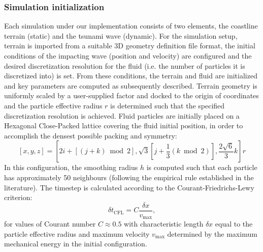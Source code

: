 \documentclass{llncs}
\begin{document}
\subsubsection{Simulation initialization} Each simulation under our implementation
consists of two elements, the coastline terrain (static) and the tsunami wave
(dynamic). For the simulation setup, terrain is imported from a suitable 3D geometry
definition file format, the initial conditions of the impacting wave (position and
velocity) are configured and the desired discretization resolution for the fluid (i.e. the
number of particles it is discretized into) is set. From these conditions, the terrain and
fluid are initialized and key parameters are computed as subsequently described. Terrain
geometry is uniformly scaled by a user-supplied factor and docked to the origin of
coordinates and the particle effective radius $r$ is determined such that the specified
discretization resolution is achieved. Fluid particles are initially placed on a Hexagonal
Close-Packed lattice covering the fluid initial position, in order to accomplish the
densest possible packing and symmetry:
\begin{equation}
  \label{eq:hcp}
  [x, y, z] = \left[ 2i+[(j+k) \bmod 2], \sqrt{3}[j + \frac{1}{3} (k \bmod 2)],
    \frac{2\sqrt{6}}{3} k \right] r
\end{equation}
In this configuration, the smoothing radius $h$ is computed such that each particle has
approximately 50 neighbours (following the empirical rule established in the
literature). The timestep is calculated according to the Courant-Friedrichs-Lewy
criterion:
\begin{equation}
  \label{eq:cfl}
  \delta t_{\text{CFL}} = C \frac {\delta x}{v_{\text{max}}},
\end{equation}
for values of Courant number $C\approx0.5$ with characteristic length $\delta x$ equal to
the particle effective radius and maximum velocity $v_{\text{max}}$ determined by the
maximum mechanical energy in the initial configuration.
\end{document}
